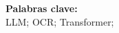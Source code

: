 \documentclass[../main.tex]{subfiles}
\begin{document}
%
%

\noindent \textbf{Palabras clave:}\\
\noindent LLM; OCR; Transformer;
\end{document}
